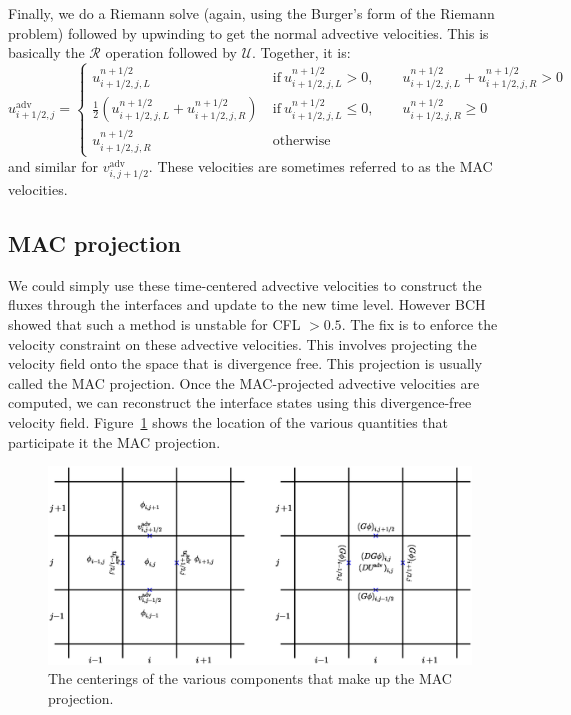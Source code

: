 Finally, we do a Riemann solve (again, using the Burger's form of the
Riemann problem) followed by upwinding to get the normal advective
velocities.  This is basically the $\mathcal{R}$ operation followed 
by $\mathcal{U}$.  Together, it is:
\begin{equation}
u^\mathrm{adv}_{i+1/2,j} = \left \{ \begin{array}{cl}
   u_{i+1/2,j,L}^{n+1/2}  & 
         \mathrm{~if~} u_{i+1/2,j,L}^{n+1/2} > 0, \qquad 
                       u_{i+1/2,j,L}^{n+1/2} + u_{i+1/2,j,R}^{n+1/2} > 0 \\
   \frac{1}{2} \left ( u_{i+1/2,j,L}^{n+1/2} +
                       u_{i+1/2,j,R}^{n+1/2} \right )  &
          \mathrm{~if~} u_{i+1/2,j,L}^{n+1/2} \le 0, \qquad 
                        u_{i+1/2,j,R}^{n+1/2} \ge 0 \\
   u_{i+1/2,j,R}^{n+1/2}  & \mathrm{~otherwise}
  \end{array}
  \right .
\end{equation}
and similar for $v^\mathrm{adv}_{i,j+1/2}$.  
These velocities are sometimes referred to as the MAC velocities.


\subsection{MAC projection}

We could simply use these time-centered advective velocities to
construct the fluxes through the interfaces and update to the new time
level.  However BCH showed that such a method is unstable for CFL $>
0.5$.  The fix is to enforce the velocity constraint on these advective
velocities.  This involves projecting the velocity field onto the
space that is divergence free.  This projection is usually called the
MAC projection.  Once the MAC-projected advective velocities are
computed, we can reconstruct the interface states using this
divergence-free velocity field.  Figure~\ref{fig:incomp:MACsolve}
shows the location of the various quantities that participate
it the MAC projection.

\begin{figure}[t]
\centering
\includegraphics[width=\linewidth]{MAC_solve}
\caption[MAC grid data centerings] {\label{fig:incomp:MACsolve} The
  centerings of the various components that make up the MAC
  projection.}
\end{figure}

